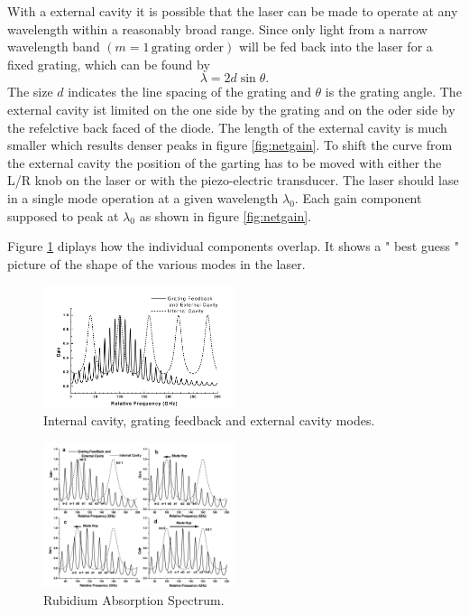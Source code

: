 With a external cavity it is possible that the laser can be made to operate at any wavelength within a reasonably broad range.
Since only light from a narrow wavelength band $\left(m = 1  \,\text{grating order}\right)$ will be fed back into the laser for a fixed grating,
which can be found by 
\begin{equation}
    \lambda = 2 d \sin \theta.
\end{equation}
The size $d$ indicates the line spacing of the grating and $\theta$ is the grating angle. The external cavity ist limited on the one side by the grating and on the
oder side by the refelctive back faced  of the diode. The length of the external cavity is much smaller which results denser peaks in figure \ref{fig:netgain}.
To shift the curve from the external cavity the position of the garting has to be moved with either the L/R knob on the laser or with the piezo-electric transducer.
The laser should lase in a single mode operation at a given wavelength $\lambda_0$. Each gain component supposed to peak at $\lambda_0$ as shown in figure \ref{fig:netgain}.

Figure \ref{fig:best} diplays how the individual components overlap. It shows a " best guess " picture of the shape of the various modes in the laser.
\begin{figure}[H]
    \centering
    \includegraphics[width=0.5\textwidth]{content/graphics/best-guess.jpg}
    \caption{Internal cavity, grating feedback and external cavity modes.\cite{diode_laser}}
    \label{fig:best} 
\end{figure}


\begin{figure}[H]
    \centering
    \includegraphics[width=0.5\textwidth]{content/graphics/modehops.jpg}
    \caption{Rubidium Absorption Spectrum.\cite{diode_laser}} %
    \label{fig:mode} 
\end{figure}

